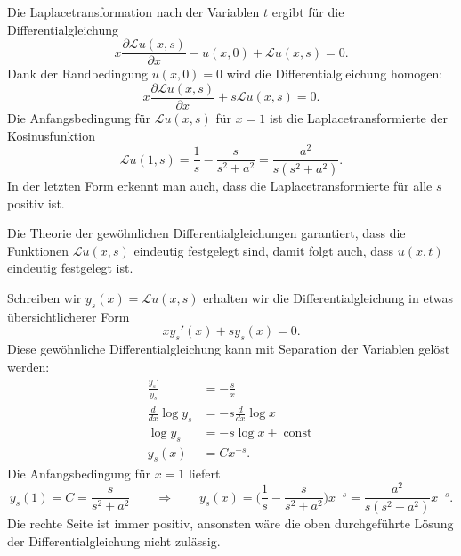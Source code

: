 \begin{loesung}
\begin{teilaufgaben}
\item
Die Laplacetransformation nach der Variablen $t$
ergibt für die Differentialgleichung
\[
x\frac{\partial\mathscr{L}u(x,s)}{\partial x}
-
u(x,0)+\mathscr{L}u(x,s)=0.
\]
Dank der Randbedingung $u(x,0)=0$ wird die Differentialgleichung
homogen:
\[
x\frac{\partial\mathscr{L}u(x,s)}{\partial x}
+
s\mathscr{L}u(x,s)=0.
\]
Die Anfangsbedingung für $\mathscr{L}u(x,s)$ für $x=1$ ist die
Laplacetransformierte der Kosinusfunktion
\[
\mathscr{L}u(1,s)=\frac1s-\frac{s}{s^2+a^2} = \frac{a^2}{s(s^2+a^2)}.
\]
In der letzten Form erkennt man auch, dass die Laplacetransformierte
für alle $s$ positiv ist.
\item
Die Theorie der gewöhnlichen Differentialgleichungen garantiert, dass
die Funktionen $\mathscr{L}u(x,s)$ eindeutig festgelegt sind, damit folgt
auch, dass $u(x,t)$ eindeutig festgelegt ist.
\item
Schreiben wir $y_s(x)=\mathscr{L}u(x,s)$ erhalten wir die Differentialgleichung
in etwas übersichtlicherer Form
\begin{equation}
xy_s'(x)+sy_s(x)=0.
\label{50000008:sdgl}
\end{equation}
Diese gewöhnliche Differentialgleichung kann mit Separation der
Variablen gelöst werden:
\begin{align*}
\frac{y_s'}{y_s}&=-\frac{s}{x}
\\
\frac{d}{dx}\log y_s&=-s\frac{d}{dx}\log x
\\
\log y_s&=-s\log x+\operatorname{const}
\\
y_s(x)&=Cx^{-s}.
\end{align*}
Die Anfangsbedingung für $x=1$ liefert
\begin{equation}
y_s(1)=C=\frac{s}{s^2+a^2}
\qquad\Rightarrow\qquad
y_s(x)
=
\biggl(\frac1s-\frac{s}{s^2+a^2}\biggr)x^{-s}
=
\frac{a^2}{s(s^2+a^2)}x^{-s}.
\label{50000008:loesung}
\end{equation}
Die rechte Seite ist immer positiv, ansonsten wäre die oben durchgeführte
Lösung der Differentialgleichung nicht zulässig.
\qedhere
\end{teilaufgaben}
\end{loesung}

